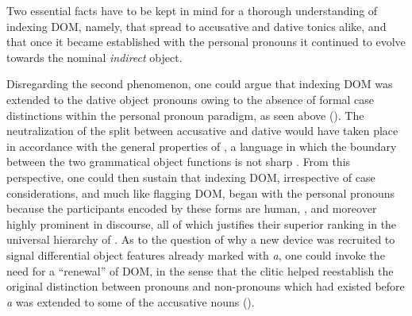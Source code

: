 \documentclass[output=paper]{LSP/langsci}
\begin{document}
 Two essential facts have to be kept in mind for a thorough understanding of  indexing DOM, namely, that  spread to accusative and dative tonics alike, and that once it became established with the personal pronouns it continued to evolve towards the nominal \textit{indirect} object.

 Disregarding the second phenomenon, one could argue that indexing DOM was extended to the dative object pronouns owing to the absence of formal case distinctions within the personal pronoun paradigm, as seen above (). The neutralization of the split between accusative and dative would have taken place in accordance with the general properties of , a language in which the boundary between the two grammatical object functions is not sharp \citep{Garcia2015Variable}. From this perspective, one could then sustain that indexing DOM, irrespective of case considerations, and much like flagging DOM, began with the personal pronouns because the participants encoded by these forms are human, , and moreover highly prominent in discourse, all of which justifies their superior ranking in the universal hierarchy of . As to the question of why a new device was recruited to signal differential object features already marked with \textit{a}, one could invoke the need for a “renewal” of DOM, in the sense that the clitic helped reestablish the original distinction between pronouns and non-pronouns which had existed before \textit{a} was extended to some of the accusative nouns ().
\end{document}
